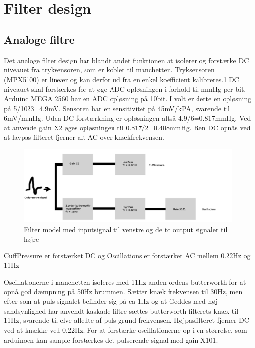 \newpage
\chapter{Filter design} \label{title:filters}

\section{Analoge filtre}

Det analoge filter design har blandt andet funktionen at isolerer og forstærke DC niveauet fra tryksensoren, som er koblet til manchetten. Tryksensoren (MPX5100) er lineær og kan derfor ud fra en enkel koefficient kalibreres.1 DC niveauet skal forstærkes for at øge ADC opløsningen i forhold til mmHg per bit. Arduino MEGA 2560 har en ADC opløsning på 10bit. I volt er dette en opløsning på 5/1023=4.9mV. Sensoren har en sensitivitet på 45mV/kPA, svarende til 6mV/mmHg. Uden DC forstærkning er opløsningen altså 4.9/6=0.817mmHg. Ved at anvende gain X2 øges opløsningen til 0.817/2=0.408mmHg. Ren DC opnås ved at lavpas filteret fjerner alt AC over knækfrekvensen.

\begin{figure}[H]
	\includegraphics[width=\textwidth]{Implementeringsdokument/billeder/AnalogFilter.png}
	\caption{Filter model med inputsignal til venstre og de to output signaler	til højre}\label{pic:analogfilter}
\end{figure}
CuffPressure er forstærket DC og Oscillations er forstærket AC mellem 0.22Hz og 11Hz

Oscillationerne i manchetten isoleres med 11Hz anden ordens butterworth for at opnå god dæmpning på 50Hz brummen. \cite{RefWorks:8} Sætter knæk frekvensen til 30Hz, men efter som at puls signalet befinder sig på ca 1Hz og at Geddes med høj sandsynlighed har anvendt kaskade filtre sættes butterworth filterets knæk til 11Hz, svarende til elve afledte af puls grund frekvensen. Højpasfilteret fjerner DC ved at knække ved 0.22Hz. For at forstærke oscillationerne op i en størrelse, som arduinoen kan sample forstærkes det pulserende signal med gain X101.

